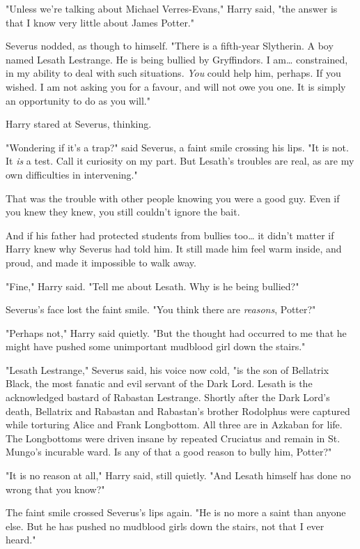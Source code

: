 "Unless we're talking about Michael Verres-Evans," Harry said, "the answer is
that I know very little about James Potter."

Severus nodded, as though to himself. "There is a fifth-year Slytherin. A boy
named Lesath Lestrange. He is being bullied by Gryffindors. I am{\ldots}
constrained, in my ability to deal with such situations. \emph{You} could help
him, perhaps. If you wished. I am not asking you for a favour, and will not owe
you one. It is simply an opportunity to do as you will."

Harry stared at Severus, thinking.

"Wondering if it's a trap?" said Severus, a faint smile crossing his lips. "It
is not. It \emph{is} a test. Call it curiosity on my part. But Lesath's
troubles are real, as are my own difficulties in intervening."

That was the trouble with other people knowing you were a good guy. Even if you
knew they knew, you still couldn't ignore the bait.

And if his father had protected students from bullies too{\ldots} it didn't
matter if Harry knew why Severus had told him. It still made him feel warm
inside, and proud, and made it impossible to walk away.

"Fine," Harry said. "Tell me about Lesath. Why is he being bullied?"

Severus's face lost the faint smile. "You think there are \emph{reasons},
Potter?"

"Perhaps not," Harry said quietly. "But the thought had occurred to me that he
might have pushed some unimportant mudblood girl down the stairs."

"Lesath Lestrange," Severus said, his voice now cold, "is the son of Bellatrix
Black, the most fanatic and evil servant of the Dark Lord. Lesath is the
acknowledged bastard of Rabastan Lestrange. Shortly after the Dark Lord's
death, Bellatrix and Rabastan and Rabastan's brother Rodolphus were captured
while torturing Alice and Frank Longbottom. All three are in Azkaban for life.
The Longbottoms were driven insane by repeated Cruciatus and remain in St.
Mungo's incurable ward. Is any of that a good reason to bully him, Potter?"

"It is no reason at all," Harry said, still quietly. "And Lesath himself has
done no wrong that you know?"

The faint smile crossed Severus's lips again. "He is no more a saint than
anyone else. But he has pushed no mudblood girls down the stairs, not that I
ever heard."

